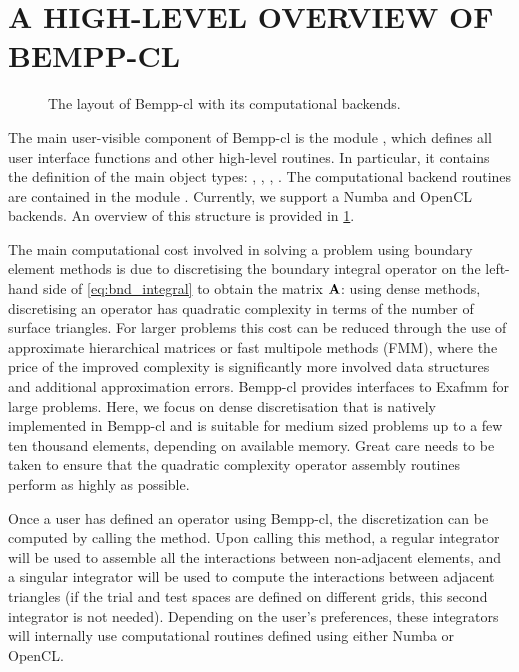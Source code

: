 \section{A HIGH-LEVEL OVERVIEW OF BEMPP-CL}

\begin{figure}
  \centering
  
  \caption{The layout of Bempp-cl with its computational backends.}
  \label{fig:overview}
\end{figure}

The main user-visible component of Bempp-cl is the module , which defines all user interface functions and other high-level routines. In particular, it contains the definition of the main object types: , , , . The computational backend routines are contained in the module . Currently, we support a Numba and OpenCL backends. An overview of this structure is provided in \cref{fig:overview}.

The main computational cost involved in solving a problem using boundary element methods is due to discretising the boundary integral operator on the left-hand side of \cref{eq:bnd_integral} to obtain the matrix $\mathbf{A}$: using dense methods, discretising an operator has quadratic complexity in terms of the number of surface triangles. For larger problems this cost can be reduced through the use of approximate hierarchical matrices or fast multipole methods (FMM), where the price of the improved complexity is significantly more involved data structures and additional approximation errors. Bempp-cl provides interfaces to Exafmm \cite{bempp_exafmm} for large problems. Here, we focus on dense discretisation that is natively implemented in Bempp-cl and is suitable for medium sized problems up to a few ten thousand elements, depending on available memory. Great care needs to be taken to ensure that the quadratic complexity operator assembly routines perform as highly as possible.

Once a user has defined an operator using Bempp-cl, the discretization can be computed by calling the  method. Upon calling this method, a regular integrator will be used to assemble all the interactions between non-adjacent elements, and a singular integrator will be used to compute the interactions between adjacent triangles (if the trial and test spaces are defined on different grids, this second integrator is not needed). Depending on the user's preferences, these integrators will internally use computational routines defined using either Numba or OpenCL.

